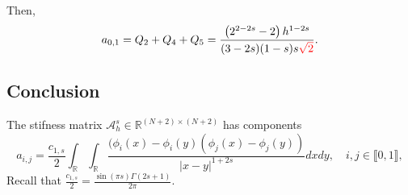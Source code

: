 \documentclass[11 pt]{article}
\newcommand\inter[1]{\llbracket #1\rrbracket}
\numberwithin{equation}{section}
\def\R{\mathbb{R}}
\newcommand{\B}[1]{{\color{red} #1}}  %
\begin{document}
Then,
\begin{align*}
a_{0,1}=Q_2+Q_4+Q_5=\frac{\left(2^{2-2 s}-2\right) h^{1-2 s}}{(3-2 s) (1-s) s\B{\sqrt{2}}}.
\end{align*}

\subsection{Conclusion}

The stifness matrix $\mathcal A_h^s\in\mathbb R^{(N+2)\times (N+2)}$ has components
%
\begin{equation}\label{eq:def_aijs_s}
a_{i,j}=\frac{c_{1,s}}{2}\int_{\R}\int_{\R}\frac{(\phi_i(x)-\phi_i(y)(\phi_j(x)-\phi_j(y))}{|x-y|^{1+2s}}dx dy, \quad i,j\in\inter{0,1}, 
\end{equation}
Recall that $\frac{c_{1,s}}{2}=\frac{\sin (\pi  s) \Gamma (2 s+1)}{2\pi}$.
\end{document}
